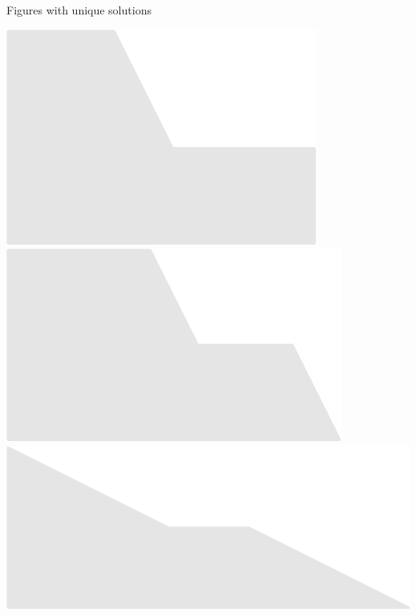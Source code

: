 \documentclass[14pt]{beamer}
\begin{document}
\begin{frame}{Figures with unique solutions}
\begin{center}
            \includegraphics[scale=0.40]{figures/figure022w.pdf}\qquad
            \includegraphics[scale=0.40]{figures/figure022x.pdf}\qquad
            \includegraphics[scale=0.40]{figures/figure022y.pdf} \\
            
            \bigskip\bigskip
        \end{center}
    \end{frame}

\end{document}
